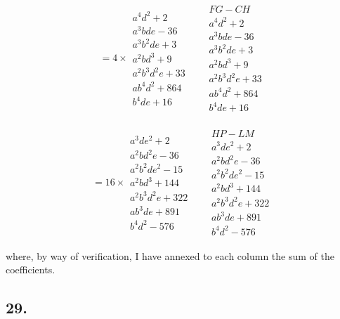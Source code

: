 \documentclass[11pt,a4paper]{article}
\theoremstyle{definition}
\begin{document}
\begin{align*}
= 4 \times
\begin{array}{l}
a^{4}d^{2} + 2\\
a^{3}bde - 36\\
a^{3}b^{2}de + 3\\
a^{2}bd^{3} + 9\\
a^{2}b^{3}d^{2}e + 33\\
ab^{4}d^{2} + 864\\
b^{4}de + 16
\end{array}
&&
\begin{array}{l}
FG - CH\\
a^{4}d^{2} + 2\\
a^{3}bde - 36\\
a^{3}b^{2}de + 3\\
a^{2}bd^{3} + 9\\
a^{2}b^{3}d^{2}e + 33\\
ab^{4}d^{2} + 864\\
b^{4}de + 16
\end{array}
\end{align*}

\begin{align*}
= 16 \times
\begin{array}{l}
a^{3}de^{2} + 2\\
a^{2}bd^{2}e - 36\\
a^{2}b^{2}de^{2} - 15\\
a^{2}bd^{3} + 144\\
a^{2}b^{3}d^{2}e + 322\\
ab^{3}de + 891\\
b^{4}d^{2} - 576
\end{array}
&&
\begin{array}{l}
HP - LM\\
a^{3}de^{2} + 2\\
a^{2}bd^{2}e - 36\\
a^{2}b^{2}de^{2} - 15\\
a^{2}bd^{3} + 144\\
a^{2}b^{3}d^{2}e + 322\\
ab^{3}de + 891\\
b^{4}d^{2} - 576
\end{array}
\end{align*}

\newpage
where, by way of verification, I have annexed to each column the sum of the coefficients.

\subsection*{29.}
\end{document}
